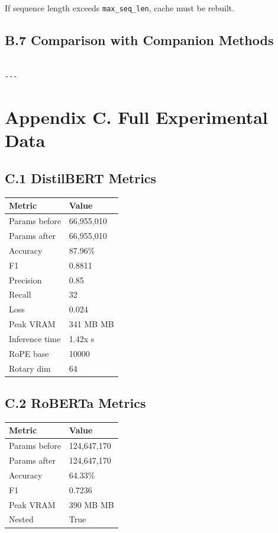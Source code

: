 {If sequence length exceeds \texttt{max\_seq\_len}, cache must be rebuilt.

\subsection{B.7 Comparison with Companion Methods}

\begin{lstlisting}

---
\end{lstlisting}


\section{Appendix C. Full Experimental Data}

\subsection{C.1 DistilBERT Metrics}

\begin{table}[H]
\centering
\small
\begin{tabular}{ll}
\toprule
\textbf{Metric} & \textbf{Value} \\
\midrule
Params before & 66,955,010 \\
Params after & 66,955,010 \\
Accuracy & 87.96\% \\
F1 & 0.8811 \\
Precision & 0.85 \\
Recall & 32 \\
Loss & 0.024 \\
Peak VRAM & 341 MB MB \\
Inference time & 1.42x s \\
RoPE base & 10000 \\
Rotary dim & 64 \\
\bottomrule
\end{tabular}
\end{table}

\subsection{C.2 RoBERTa Metrics}

\begin{table}[H]
\centering
\small
\begin{tabular}{ll}
\toprule
\textbf{Metric} & \textbf{Value} \\
\midrule
Params before & 124,647,170 \\
Params after & 124,647,170 \\
Accuracy & 64.33\% \\
F1 & 0.7236 \\
Peak VRAM & 390 MB MB \\
Nested & True \\
\bottomrule
\end{tabular}
\end{table}

}
